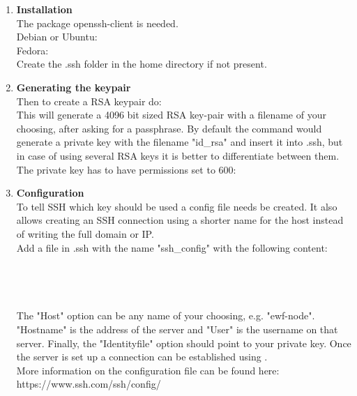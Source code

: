 \begin{enumerate}
    \item{\textbf{Installation}}\\
        The package openssh-client is needed.\\
Debian or Ubuntu: \\
Fedora: \\
Create the .ssh folder in the home directory if not present. \\
    \item{\textbf{Generating the keypair}}\\
Then to create a RSA keypair do: \\
This will generate a 4096 bit sized RSA key-pair with a filename of your choosing, after asking for a passphrase. By default the command would generate a private key with the filename "id\_rsa" and insert it into .ssh, but in case of using several RSA keys it is better to differentiate between them.  \\
The private key has to have permissions set to 600:\\
    \item{\textbf{Configuration}}\\
To tell SSH which key should be used a config file needs be created. It also allows creating an SSH connection using a shorter name for the host instead of writing the full domain or IP.\\
Add a file in .ssh with the name "ssh\_config" with the following content:\\
\\ \indent
 \hspace{15pt} \\ \indent
\hspace{15pt} \\ \indent
\hspace{15pt} \\
The "Host" option can be any name of your choosing, e.g. "ewf-node". "Hostname" is the address of the server and "User" is the username on that server. Finally, the "Identityfile" option should point to your private key. Once the server is set up a connection can be established using .  \\
More information on the configuration file can be found here: \\ https://www.ssh.com/ssh/config/
\end{enumerate}
